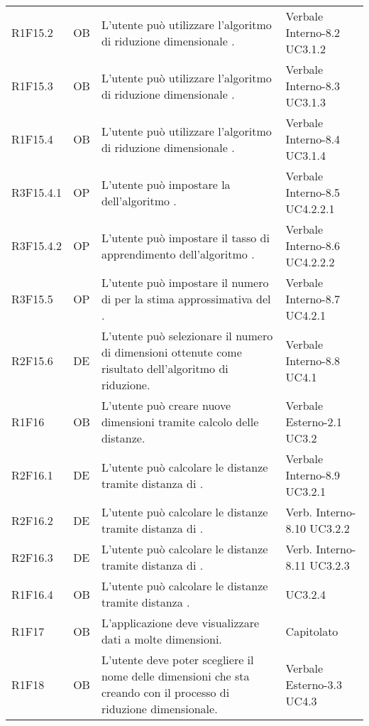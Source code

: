 {\begin{longtable}{C{2cm} | C{1.5cm} | C{9cm} | C{3.3cm}}
R1F15.2 & OB & L'utente può utilizzare l'algoritmo di riduzione dimensionale . & Verbale Interno-8.2 \newline UC3.1.2\\
R1F15.3 & OB & L'utente può utilizzare l'algoritmo di riduzione dimensionale . & Verbale Interno-8.3 \newline UC3.1.3\\
R1F15.4 & OB & L'utente può utilizzare l'algoritmo di riduzione dimensionale . & Verbale Interno-8.4 \newline UC3.1.4\\
R3F15.4.1 & OP & L'utente può impostare la  dell'algoritmo . & Verbale Interno-8.5 \newline UC4.2.2.1\\
R3F15.4.2 & OP & L'utente può impostare il tasso di apprendimento dell'algoritmo . & Verbale Interno-8.6 \newline UC4.2.2.2\\
R3F15.5 & OP & L'utente può impostare il numero di  per la stima approssimativa del . & Verbale Interno-8.7 \newline UC4.2.1\\
R2F15.6 & DE & L'utente può selezionare il numero di dimensioni ottenute come risultato dell'algoritmo di riduzione. & Verbale Interno-8.8 \newline UC4.1\\
R1F16 & OB & L'utente può creare nuove dimensioni tramite calcolo delle distanze. & Verbale Esterno-2.1 \newline UC3.2\\ 
R2F16.1 & DE & L'utente può calcolare le distanze tramite distanza di . &  Verbale Interno-8.9 \newline UC3.2.1\\
R2F16.2 & DE & L'utente può calcolare le distanze tramite distanza di . & Verb. Interno-8.10 \newline UC3.2.2 \\
R2F16.3 & DE & L'utente può calcolare le distanze tramite distanza di . &  Verb. Interno-8.11 \newline UC3.2.3\\
R1F16.4 & OB & L'utente può calcolare le distanze tramite distanza . &  UC3.2.4\\
R1F17 & OB & L'applicazione deve visualizzare dati a molte dimensioni. & Capitolato\\
R1F18 & OB & L'utente deve poter scegliere il nome delle dimensioni che sta creando con il processo di riduzione dimensionale. & Verbale Esterno-3.3 \newline UC4.3\\

\end{longtable}
}







